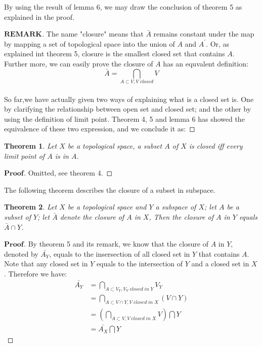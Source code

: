 \documentclass[a4paper, 11pt]{article}
\newtheorem{theorem}{Theorem}
\theoremstyle{remark}
\newenvironment{myremark}
{\renewcommand\qedsymbol{$ $}\begin{proof}[$\mathbf{REMARK}$]}
  {\end{proof}}
\newenvironment{myprf}
{\renewcommand\qedsymbol{$ $}\begin{proof}[$\mathbf{Proof}$]}
  {\end{proof}}
\theoremstyle{definition}
\begin{document}
\noindent
By using the result of lemma 6, we may draw the conclusion of theorem 5 as 
explained in the proof.
\begin{myremark}
     The name "closure" means that $\bar{A}$ remains constant under the map 
     by mapping a set of topological space into the union of $A$ and 
     $A^{'}$. Or, as explained 
     int theorem 5, closure is the smallest closed set that contains $A$.
     Further more, we can easily prove the closure of $A$ 
     has an equvalent definition:
     $$
     \bar{A}=\bigcap_{A\subset V,V\;closed}V
     $$\\
     So far,we have actually given two ways of explaining what is a closed set
     is. One by clarifying the relationship between open set and closed set; and
     the other by using the definition of limit point. Theorem 4, 5 and lemma 6
     has showed the equivalence of these two expression, and we conclude it as:
\end{myremark}
\begin{theorem}
     Let $X$ be a topological space, a subset $A$ of $X$ is closed iff every limit
     point of $A$ is in $A$.
\end{theorem}
\begin{myprf}
       Omitted, see theorem 4.
\end{myprf}
\vspace{0.3cm}
\noindent
The following theorem describes the closure of a subset in subspace.
\begin{theorem}
       Let $X$ be a topological space and $Y$ a subspace of $X$; let $A$ be 
       a subset of $Y$; let $\bar{A}$ denote the closure of $A$ in $X$, Then 
       the closure of $A$ in $Y$ equals $\bar{A}\cap Y$.
\end{theorem}
\begin{myprf}
        By theorem 5 and its remark, we know that the closure of $A$ in $Y$, 
        denoted by $\bar{A_{Y}}$, equals to the insersection of all closed
        set in $Y$ that contains $A$. Note that any closed set in $Y$ equals 
        to the intersection of $Y$ and a closed set in $X$. Therefore 
        we have:
        $$
        \begin{aligned}
                \bar{A_Y}&=\bigcap_{A\subset V_Y,V_Y\;closed\;in\;Y}V_Y\\
                         &=\bigcap_{A\subset V\cap Y,V\;closed\;in\;X}(V\cap Y)\\
                         &=(\bigcap_{A\subset V,V\;closed\;in\;X}V)\bigcap Y\\
                         &=\bar{A_X}\bigcap Y
        \end{aligned}
        $$ 
\end{myprf} 
\end{document}

